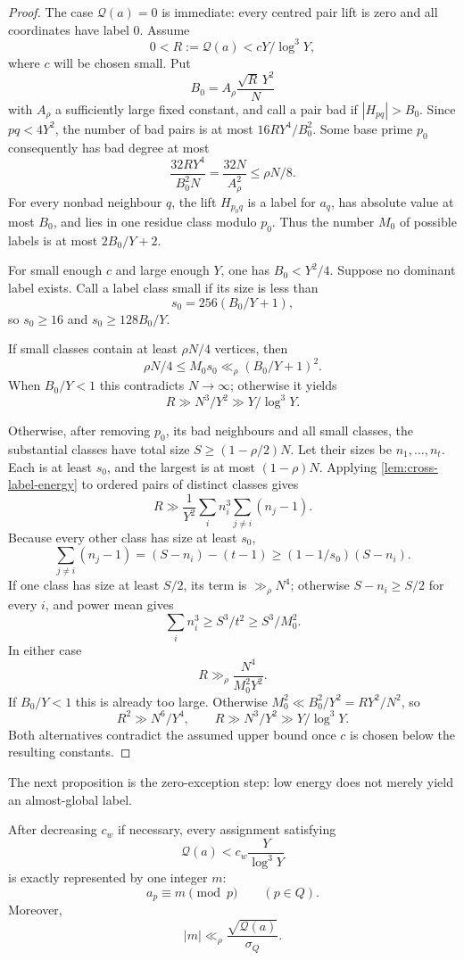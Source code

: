 \begin{proof}
The case $\mathcal Q(a)=0$ is immediate: every centred pair lift is zero and all coordinates have label $0$.  Assume
\[
 0<R:=\mathcal Q(a)<cY/\log^3Y,
\]
where $c$ will be chosen small.  Put
\[
 B_0=A_\rho\frac{\sqrt R\,Y^2}{N}
\]
with $A_\rho$ a sufficiently large fixed constant, and call a pair bad if $|H_{pq}|>B_0$.  Since $pq<4Y^2$, the number of bad pairs is at most $16RY^4/B_0^2$.  Some base prime $p_0$ consequently has bad degree at most
\[
 \frac{32RY^4}{B_0^2N}=\frac{32N}{A_\rho^2}\leq\rho N/8.
\]
For every nonbad neighbour $q$, the lift $H_{p_0q}$ is a label for $a_q$, has absolute value at most $B_0$, and lies in one residue class modulo $p_0$.  Thus the number $M_0$ of possible labels is at most $2B_0/Y+2$.

For small enough $c$ and large enough $Y$, one has $B_0<Y^2/4$.  Suppose no dominant label exists.  Call a label class small if its size is less than
\[
 s_0=256(B_0/Y+1),
\]
so $s_0\geq16$ and $s_0\geq128B_0/Y$.

If small classes contain at least $\rho N/4$ vertices, then
\[
 \rho N/4\leq M_0s_0\ll_\rho(B_0/Y+1)^2.
\]
When $B_0/Y<1$ this contradicts $N\to\infty$; otherwise it yields
\[
 R\gg N^3/Y^2\gg Y/\log^3Y.
\]

Otherwise, after removing $p_0$, its bad neighbours and all small classes, the substantial classes have total size $S\geq(1-\rho/2)N$.  Let their sizes be $n_1,\ldots,n_t$.  Each is at least $s_0$, and the largest is at most $(1-\rho)N$.  Applying \cref{lem:cross-label-energy} to ordered pairs of distinct classes gives
\[
 R\gg\frac1{Y^2}\sum_i n_i^3\sum_{j\neq i}(n_j-1).
\]
Because every other class has size at least $s_0$,
\[
 \sum_{j\neq i}(n_j-1)
 =(S-n_i)-(t-1)
 \geq(1-1/s_0)(S-n_i).
\]
If one class has size at least $S/2$, its term is $\gg_\rho N^4$; otherwise $S-n_i\geq S/2$ for every $i$, and power mean gives
\[
 \sum_i n_i^3\geq S^3/t^2\geq S^3/M_0^2.
\]
In either case
\[
 R\gg_\rho\frac{N^4}{M_0^2Y^2}.
\]
If $B_0/Y<1$ this is already too large.  Otherwise $M_0^2\ll B_0^2/Y^2=RY^2/N^2$, so
\[
 R^2\gg N^6/Y^4,
 \qquad
 R\gg N^3/Y^2\gg Y/\log^3Y.
\]
Both alternatives contradict the assumed upper bound once $c$ is chosen below the resulting constants.
\end{proof}

The next proposition is the zero-exception step: low energy does not merely yield an almost-global label.

\begin{proposition}
\label{prop:exact-cold-rigidity}
After decreasing $c_w$ if necessary, every assignment satisfying
\[
 \mathcal Q(a)<c_w\frac{Y}{\log^3Y}
\]
is exactly represented by one integer $m$:
\[
 a_p\equiv m\pmod p
 \qquad(p\in Q).
\]
Moreover,
\[
 |m|\ll_\rho\frac{\sqrt{\mathcal Q(a)}}{\sigma_Q}.
\]
\end{proposition}

